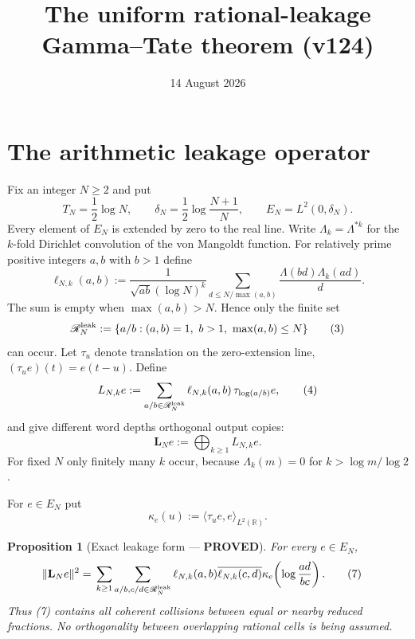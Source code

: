 \documentclass[11pt]{article}
\title{The uniform rational-leakage Gamma--Tate theorem (v124)}
\date{14 August 2026}
\newcommand{\PROVED}{\textcolor{green!40!black}{\textbf{PROVED}}}
\newtheorem{proposition}{Proposition}
\begin{document}
\maketitle

\section{The arithmetic leakage operator}

Fix an integer $N\ge2$ and put
\begin{equation}
 T_N=\frac12\log N,
 \qquad
 \delta_N=\frac12\log\frac{N+1}{N},
 \qquad
 E_N=L^2(0,\delta_N).                                      \tag{1}
\end{equation}
Every element of $E_N$ is extended by zero to the real line.  Write
$\Lambda_k=\Lambda^{*k}$ for the $k$-fold Dirichlet convolution of the
von Mangoldt function.  For relatively prime positive integers $a,b$ with
$b>1$ define
\begin{equation}
 \ell_{N,k}(a,b)
 :=\frac1{\sqrt{ab}(\log N)^k}
 \sum_{d\le N/\max(a,b)}
       \frac{\Lambda(bd)\Lambda_k(ad)}d.                    \tag{2}
\end{equation}
The sum is empty when $\max(a,b)>N$.  Hence only the finite set
\begin{equation}
 \mathscr R_N^{\rm leak}
 :=\{a/b:(a,b)=1,\ b>1,\ \max(a,b)\le N\}                 \tag{3}
\end{equation}
can occur.  Let $\tau_u$ denote translation on the zero-extension line,
$(\tau_ue)(t)=e(t-u)$.  Define
\begin{equation}
 L_{N,k}e
 :=\sum_{a/b\in\mathscr R_N^{\rm leak}}
       \ell_{N,k}(a,b)\,\tau_{\log(a/b)}e,                 \tag{4}
\end{equation}
and give different word depths orthogonal output copies:
\begin{equation}
 \mathbf L_Ne:=\bigoplus_{k\ge1}L_{N,k}e.
                                                                    \tag{5}
\end{equation}
For fixed $N$ only finitely many $k$ occur, because
$\Lambda_k(m)=0$ for $k>\log m/\log2$.

For $e\in E_N$ put
\begin{equation}
 \kappa_e(u):=\langle\tau_ue,e\rangle_{L^2(\mathbb R)}.    \tag{6}
\end{equation}

\begin{proposition}[Exact leakage form --- \PROVED]
For every $e\in E_N$,
\begin{align}
 \|\mathbf L_Ne\|^2
 ={}&\sum_{k\ge1}
 \sum_{a/b,c/d\in\mathscr R_N^{\rm leak}}
 \ell_{N,k}(a,b)\overline{\ell_{N,k}(c,d)}
 \kappa_e\!\left(\log\frac{ad}{bc}\right).               \tag{7}
\end{align}
Thus (7) contains all coherent collisions between equal or nearby reduced
fractions.  No orthogonality between overlapping rational cells is being
assumed.
\end{proposition}
\end{document}
